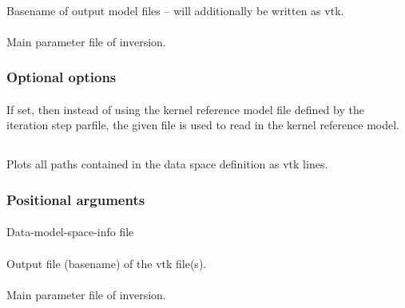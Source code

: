 \paragraph{}
Basename of output model files -- will additionally be written as vtk.
\paragraph{}
Main parameter file of inversion.
\subsubsection{Optional options}
\paragraph{}
If set, then instead of using the kernel reference model file defined by the iteration step parfile, 
the given file  is used to read in the kernel reference model.
%
%
\subsection{} \label{programs_scripts,sec:bin_prog,sec:path_to_vtk}  
Plots all paths contained in the data space definition as vtk lines. 
\subsubsection{Positional arguments}
\paragraph{}
Data-model-space-info file   
\paragraph{}
Output file (basename) of the vtk file(s).
\paragraph{}
Main parameter file of inversion.  
%
%
